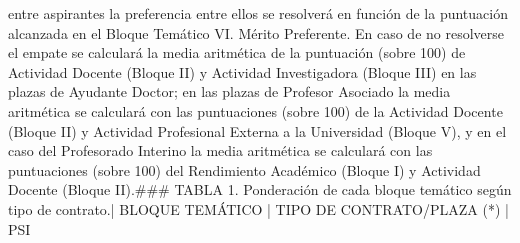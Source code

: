 \documentclass{article}
\begin{document}
\begin{itemize}
entre aspirantes la preferencia entre ellos se resolverá en función de la puntuación alcanzada en el Bloque Temático VI. Mérito Preferente. En caso de no resolverse el empate se calculará la media aritmética de la puntuación (sobre 100) de Actividad Docente (Bloque II) y Actividad Investigadora (Bloque III) en las plazas de Ayudante Doctor; en las plazas de Profesor Asociado la media aritmética se calculará con las puntuaciones (sobre 100) de la Actividad Docente (Bloque II) y Actividad Profesional Externa a la Universidad (Bloque V), y en el caso del Profesorado Interino la media aritmética se calculará con las puntuaciones (sobre 100) del Rendimiento Académico (Bloque I) y Actividad Docente (Bloque II).\n\n### TABLA 1. Ponderación de cada bloque temático según tipo de contrato.\n\n| BLOQUE TEMÁTICO                                    | TIPO DE CONTRATO/PLAZA (*) | PSI %
\end{itemize}
\end{document}
